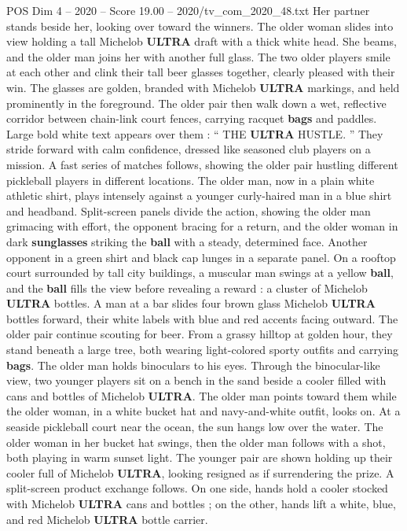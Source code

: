 \begin{textsample}{POS Dim 4 – 2020 – Score 19.00 – 2020/tv\_com\_2020\_48.txt}
Her partner stands beside her, looking over toward the winners.
The older woman slides into view holding a tall Michelob \textbf{ULTRA} draft with a thick white head.
She beams, and the older man joins her with another full glass.
The two older players smile at each other and clink their tall beer glasses together, clearly pleased with their win.
The glasses are golden, branded with Michelob \textbf{ULTRA} markings, and held prominently in the foreground.
The older pair then walk down a wet, reflective corridor between chain-link court fences, carrying racquet \textbf{bags} and paddles.
Large bold white text appears over them : “ THE \textbf{ULTRA} HUSTLE. ” They stride forward with calm confidence, dressed like seasoned club players on a mission.
A fast series of matches follows, showing the older pair hustling different pickleball players in different locations.
The older man, now in a plain white athletic shirt, plays intensely against a younger curly-haired man in a blue shirt and headband.
Split-screen panels divide the action, showing the older man grimacing with effort, the opponent bracing for a return, and the older woman in dark \textbf{sunglasses} striking the \textbf{ball} with a steady, determined face.
Another opponent in a green shirt and black cap lunges in a separate panel.
On a rooftop court surrounded by tall city buildings, a muscular man swings at a yellow \textbf{ball}, and the \textbf{ball} fills the view before revealing a reward : a cluster of Michelob \textbf{ULTRA} bottles.
A man at a bar slides four brown glass Michelob \textbf{ULTRA} bottles forward, their white labels with blue and red accents facing outward.
The older pair continue scouting for beer.
From a grassy hilltop at golden hour, they stand beneath a large tree, both wearing light-colored sporty outfits and carrying \textbf{bags}.
The older man holds binoculars to his eyes.
Through the binocular-like view, two younger players sit on a bench in the sand beside a cooler filled with cans and bottles of Michelob \textbf{ULTRA}.
The older man points toward them while the older woman, in a white bucket hat and navy-and-white outfit, looks on.
At a seaside pickleball court near the ocean, the sun hangs low over the water.
The older woman in her bucket hat swings, then the older man follows with a shot, both playing in warm sunset light.
The younger pair are shown holding up their cooler full of Michelob \textbf{ULTRA}, looking resigned as if surrendering the prize.
A split-screen product exchange follows.
On one side, hands hold a cooler stocked with Michelob \textbf{ULTRA} cans and bottles ; on the other, hands lift a white, blue, and red Michelob \textbf{ULTRA} bottle carrier.

\end{textsample}
